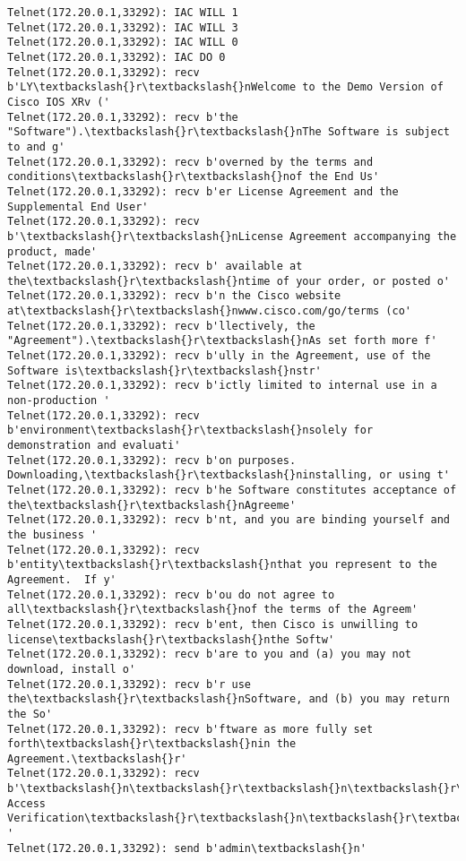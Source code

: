 \documentclass[11pt]{article}
\begin{document}
\begin{Verbatim}[commandchars=\\\{\}]
Telnet(172.20.0.1,33292): IAC WILL 1
Telnet(172.20.0.1,33292): IAC WILL 3
Telnet(172.20.0.1,33292): IAC WILL 0
Telnet(172.20.0.1,33292): IAC DO 0
Telnet(172.20.0.1,33292): recv b'LY\textbackslash{}r\textbackslash{}nWelcome to the Demo Version of Cisco IOS XRv ('
Telnet(172.20.0.1,33292): recv b'the "Software").\textbackslash{}r\textbackslash{}nThe Software is subject to and g'
Telnet(172.20.0.1,33292): recv b'overned by the terms and conditions\textbackslash{}r\textbackslash{}nof the End Us'
Telnet(172.20.0.1,33292): recv b'er License Agreement and the Supplemental End User'
Telnet(172.20.0.1,33292): recv b'\textbackslash{}r\textbackslash{}nLicense Agreement accompanying the product, made'
Telnet(172.20.0.1,33292): recv b' available at the\textbackslash{}r\textbackslash{}ntime of your order, or posted o'
Telnet(172.20.0.1,33292): recv b'n the Cisco website at\textbackslash{}r\textbackslash{}nwww.cisco.com/go/terms (co'
Telnet(172.20.0.1,33292): recv b'llectively, the "Agreement").\textbackslash{}r\textbackslash{}nAs set forth more f'
Telnet(172.20.0.1,33292): recv b'ully in the Agreement, use of the Software is\textbackslash{}r\textbackslash{}nstr'
Telnet(172.20.0.1,33292): recv b'ictly limited to internal use in a non-production '
Telnet(172.20.0.1,33292): recv b'environment\textbackslash{}r\textbackslash{}nsolely for demonstration and evaluati'
Telnet(172.20.0.1,33292): recv b'on purposes.  Downloading,\textbackslash{}r\textbackslash{}ninstalling, or using t'
Telnet(172.20.0.1,33292): recv b'he Software constitutes acceptance of the\textbackslash{}r\textbackslash{}nAgreeme'
Telnet(172.20.0.1,33292): recv b'nt, and you are binding yourself and the business '
Telnet(172.20.0.1,33292): recv b'entity\textbackslash{}r\textbackslash{}nthat you represent to the Agreement.  If y'
Telnet(172.20.0.1,33292): recv b'ou do not agree to all\textbackslash{}r\textbackslash{}nof the terms of the Agreem'
Telnet(172.20.0.1,33292): recv b'ent, then Cisco is unwilling to license\textbackslash{}r\textbackslash{}nthe Softw'
Telnet(172.20.0.1,33292): recv b'are to you and (a) you may not download, install o'
Telnet(172.20.0.1,33292): recv b'r use the\textbackslash{}r\textbackslash{}nSoftware, and (b) you may return the So'
Telnet(172.20.0.1,33292): recv b'ftware as more fully set forth\textbackslash{}r\textbackslash{}nin the Agreement.\textbackslash{}r'
Telnet(172.20.0.1,33292): recv b'\textbackslash{}n\textbackslash{}r\textbackslash{}n\textbackslash{}r\textbackslash{}nUser Access Verification\textbackslash{}r\textbackslash{}n\textbackslash{}r\textbackslash{}nUsername: '
Telnet(172.20.0.1,33292): send b'admin\textbackslash{}n'

\end{Verbatim}
\end{document}
